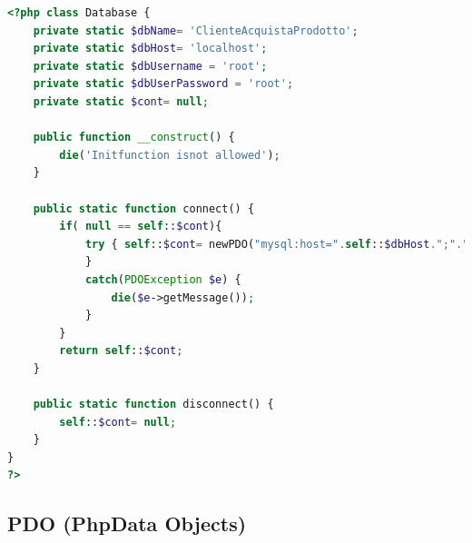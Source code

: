 \begin{lstlisting}[language=PHP]
<?php class Database {
	private static $dbName= 'ClienteAcquistaProdotto';
	private static $dbHost= 'localhost';
	private static $dbUsername = 'root';
	private static $dbUserPassword = 'root';
	private static $cont= null;
	
	public function __construct() {
		die('Initfunction isnot allowed');
	}
	
	public static function connect() {
		if( null == self::$cont){
			try { self::$cont= newPDO("mysql:host=".self::$dbHost.";"."dbname=".self::$dbName,  self::$dbUsername, self::$dbUserPassword);
			}
			catch(PDOException $e) {
				die($e->getMessage());
			}
		}
		return self::$cont; 
	}
	
	public static function disconnect() {
		self::$cont= null;
	} 
} 
?>
\end{lstlisting}


\subsection{PDO (PhpData Objects)}

